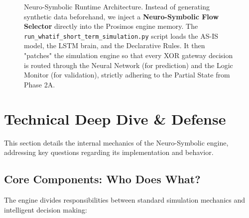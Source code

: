 \documentclass[a4paper]{article}
\begin{document}
\begin{figure}[H]
  \caption{Neuro-Symbolic Runtime Architecture. Instead of generating synthetic data beforehand, we inject a \textbf{Neuro-Symbolic Flow Selector} directly into the Prosimos engine memory. The \texttt{run\_whatif\_short\_term\_simulation.py} script loads the AS-IS model, the LSTM brain, and the Declarative Rules. It then "patches" the simulation engine so that every XOR gateway decision is routed through the Neural Network (for prediction) and the Logic Monitor (for validation), strictly adhering to the Partial State from Phase 2A.}
  \label{fig:neuro-arch}
\end{figure}

\newpage

\section{Technical Deep Dive \& Defense}

This section details the internal mechanics of the Neuro-Symbolic engine, addressing key questions regarding its implementation and behavior.

\subsection{Core Components: Who Does What?}
The engine divides responsibilities between standard simulation mechanics and intelligent decision making:
\end{document}
